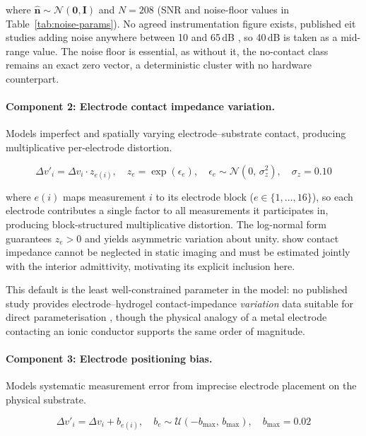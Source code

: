 \noindent where $\hat{\mathbf{n}} \sim \mathcal{N}(\mathbf{0}, \mathbf{I})$ and $N = 208$ (SNR and noise-floor values in Table~\ref{tab:noise-params}). No agreed instrumentation figure exists, published \gls{eit} studies adding noise anywhere between 10 and 65\,dB \parencite{chen2023, dong2025lattice}, so 40\,dB is taken as a mid-range value. The noise floor is essential, as without it, the no-contact class remains an exact zero vector, a deterministic cluster with no hardware counterpart.

\paragraph{Component 2: Electrode contact impedance variation.} Models imperfect and spatially varying electrode--substrate contact, producing multiplicative per-electrode distortion.

\begin{equation}
\Delta v'_i = \Delta v_i \cdot z_{e(i)}, \quad z_e = \exp(\epsilon_e), \quad \epsilon_e \sim \mathcal{N}(0,\, \sigma_z^2), \quad \sigma_z = 0.10
\label{eq:noise-impedance}
\end{equation}

\noindent where $e(i)$ maps measurement $i$ to its electrode block ($e \in \{1, \ldots, 16\}$), so each electrode contributes a single factor to all measurements it participates in, producing block-structured multiplicative distortion. The log-normal form guarantees $z_e > 0$ and yields asymmetric variation about unity. \textcite{vilhunen2002} show contact impedance cannot be neglected in static imaging and must be estimated jointly with the interior admittivity, motivating its explicit inclusion here.

This default is the least well-constrained parameter in the model: no published study provides electrode--hydrogel contact-impedance \emph{variation} data suitable for direct parameterisation \parencite{costacornella2023, park2022skin}, though the physical analogy of a metal electrode contacting an ionic conductor supports the same order of magnitude.

\paragraph{Component 3: Electrode positioning bias.} Models systematic measurement error from imprecise electrode placement on the physical substrate.

\begin{equation}
\Delta v'_i = \Delta v_i + b_{e(i)}, \quad b_e \sim \mathcal{U}(-b_{\max},\, b_{\max}), \quad b_{\max} = 0.02
\label{eq:noise-bias}
\end{equation}

